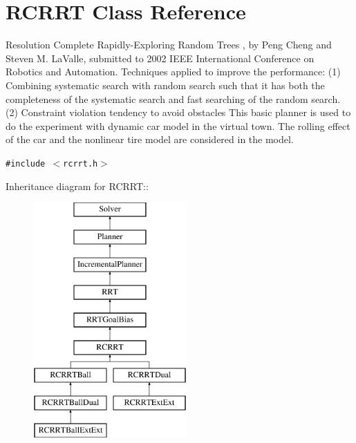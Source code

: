 \section{RCRRT  Class Reference}
\label{classRCRRT}
Resolution Complete Rapidly-Exploring Random Trees , by Peng Cheng and Steven M. La\-Valle, submitted to 2002 IEEE International Conference on Robotics and Automation. Techniques applied to improve the performance: (1) Combining systematic search with random search such that it has both the completeness of the systematic search and fast searching of the random search. (2) Constraint violation tendency to avoid obstacles This basic planner is used to do the experiment with dynamic car model in the virtual town. The rolling effect of the car and the nonlinear tire model are considered in the model. 


{\tt \#include $<$rcrrt.h$>$}

Inheritance diagram for RCRRT::\begin{figure}[H]
\begin{center}
\leavevmode
\includegraphics[height=9cm]{classRCRRT}
\end{center}
\end{figure}
